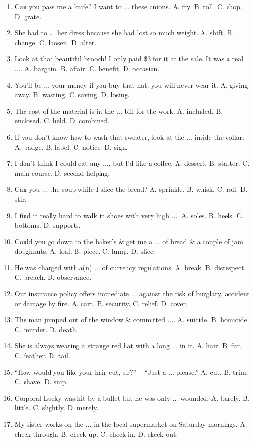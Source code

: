\documentclass{article}
\numberwithin{equation}{section}
\begin{document}
\begin{enumerate}[leftmargin=2mm]
	\item Can you pass me a knife? I want to $\ldots$ these onions. A. fry. B. roll. C. chop. D. grate.
	\item She had to $\ldots$ her dress because she had lost so much weight. A. shift. B. change. C. loosen. D. alter.
	\item Look at that beautiful brooch! I only paid \$3 for it at the sale. It was a real $\ldots$. A. bargain. B. affair. C. benefit. D. occasion.
	\item You'll be $\ldots$ your money if you buy that hat: you will never wear it. A. giving away. B. wasting. C. saving. D. losing.
	\item The cost of the material is in the $\ldots$ bill for the work. A. included. B. enclosed. C. held. D. combined.
	\item If you don't know how to wash that sweater, look at the $\ldots$ inside the collar. A. badge. B. label. C. notice. D. sign.
	\item I don't think I could eat any $\ldots$, but I'd like a coffee. A. dessert. B. starter. C. main course. D. second helping.
	\item Can you $\ldots$ the soup while I slice the bread? A. sprinkle. B. whisk. C. roll. D. stir.
	\item I find it really hard to walk in shoes with very high $\ldots$. A. soles. B. heels. C. bottoms. D. supports.
	\item Could you go down to the baker's \& get me a $\ldots$ of bread \& a couple of jam doughnuts. A. loaf. B. piece. C. lump. D. slice.
	\item He was charged with a(n) $\ldots$ of currency regulations. A. break. B. disrespect. C. breach. D. observance.
	\item Our insurance policy offers immediate $\ldots$ against the risk of burglary, accident or damage by fire. A. cart. B. security. C. relief. D. cover.
	\item The man jumped out of the window \& committed $\ldots$. A. suicide. B. homicide. C. murder. D. death.
	\item She is always wearing a strange red hat with a long $\ldots$ in it. A. hair. B. fur. C. feather. D. tail.
	\item ``How would you like your hair cut, sir?'' -- ``Just a $\ldots$ please.'' A. cut. B. trim. C. shave. D. snip.
	\item Corporal Lucky was hit by a bullet but he was only $\ldots$ wounded. A. barely. B. little. C. slightly. D. merely.
	\item My sister works on the $\ldots$ in the local supermarket on Saturday mornings. A. check-through. B. check-up. C. check-in. D. check-out.

\end{enumerate}
\end{document}
